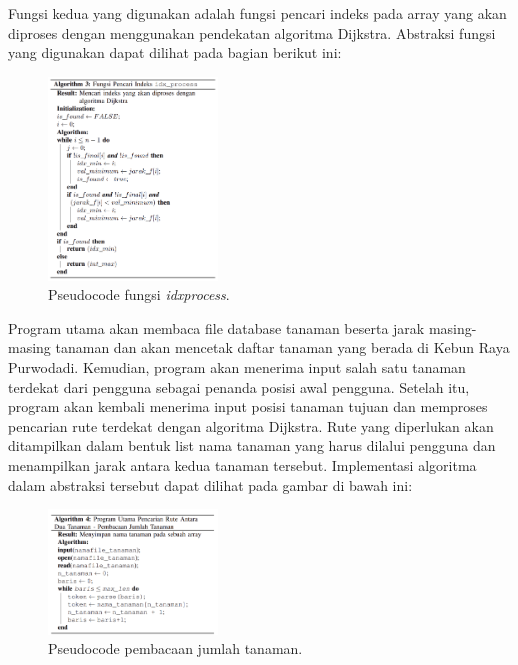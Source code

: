 \documentclass[conference]{IEEEtran}
\begin{document}
    Fungsi kedua yang digunakan adalah fungsi pencari indeks
    pada array yang akan diproses dengan menggunakan pendekatan algoritma Dijkstra. Abstraksi fungsi yang digunakan
    dapat dilihat pada bagian berikut ini:

    \begin{figure}[H]
        \centerline{\includegraphics[width=0.4\textwidth]{./sources/idx_process.png}}
        \caption{Pseudocode fungsi \textit{idxprocess}.}
        \label{fig4}
    \end{figure}

    Program utama akan membaca file database tanaman
    beserta jarak masing-masing tanaman dan akan mencetak
    daftar tanaman yang berada di Kebun Raya Purwodadi.
    Kemudian, program akan menerima input salah satu tanaman
    terdekat dari pengguna sebagai penanda posisi awal pengguna.
    Setelah itu, program akan kembali menerima input posisi
    tanaman tujuan dan memproses pencarian rute terdekat dengan
    algoritma Dijkstra. Rute yang diperlukan akan ditampilkan
    dalam bentuk list nama tanaman yang harus dilalui pengguna
    dan menampilkan jarak antara kedua tanaman tersebut.
    Implementasi algoritma dalam abstraksi tersebut dapat dilihat
    pada gambar di bawah ini:
     
    \begin{figure}[H]
        \centerline{\includegraphics[width=0.4\textwidth]{./sources/bacaJumlahTanaman.png}}
        \caption{Pseudocode pembacaan jumlah tanaman.}
        \label{fig5}
    \end{figure}  
\end{document}
